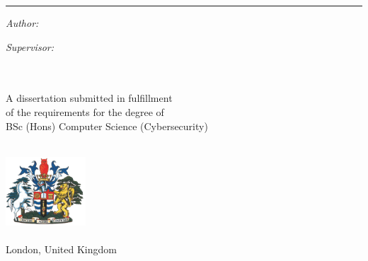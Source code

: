 \begin{titlepage}
  \doublespacing{}
  \large
  \hfill
  \vfill
  \vspace*{0.5cm}
  \begin{center}
    \doublespacing{}
    \textcolor{Blue}{\huge\textbf{\myTitle}}
  \end{center}
  \vspace{1.25cm}
  \hrule
  \vspace{1.5cm}
  \onehalfspacing{}
  \begin{center}

    \begin{minipage}[t]{0.5\textwidth}
      \begin{flushleft}
        \emph{Author:}\\
        \href{\myWebsite}{{\myFirstName} \textsc{\myLastName}}
      \end{flushleft}
    \end{minipage}
    \begin{minipage}[t]{0.4\textwidth}
      \begin{flushright}
        \emph{Supervisor:} \\
        \href{\myProfWebsite}{{\myProfTitle} {\myProfFirstName} \textsc{\myProfLastName}}\\
      \end{flushright}
    \end{minipage}\\[1.5cm]

    A dissertation submitted in fulfillment\\
    of the requirements for the degree of\\
    {BSc (Hons) Computer Science (Cybersecurity)}\\[1cm]

    \myDepartment\\
    \myFaculty{}

    \hfill
    \vfill

    \includegraphics[width=3cm]{../shared/greenwich-coat-of-arms}\\
    \href{https://www.gre.ac.uk/}{\myUni}\\
    London, United Kingdom\\[2em]
    {\mySubmissionMonth} {\mySubmissionYear}
  \end{center}
\end{titlepage}
